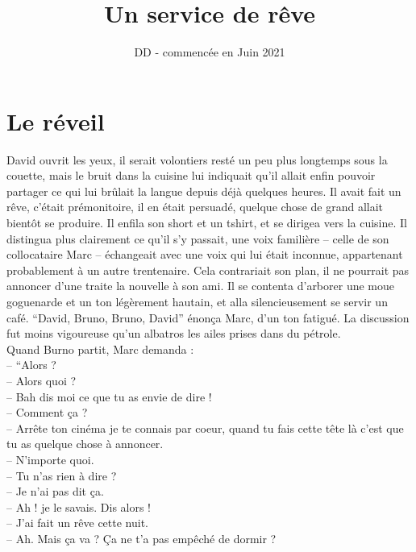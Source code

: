 \documentclass[french,amstex,12pt,a5paper]{book}
\begin{document}
\title{Un service de rêve}
\author{DD - commencée en Juin 2021}
\maketitle

\tableofcontents

\chapter{Le réveil}

David ouvrit les yeux, il serait volontiers resté un peu plus longtemps sous la couette, mais le bruit dans la cuisine lui indiquait qu'il allait enfin pouvoir partager ce qui lui brûlait la langue depuis déjà quelques heures. Il avait fait un rêve, c'était prémonitoire, il en était persuadé, quelque chose de grand allait bientôt se produire. Il enfila son short et un tshirt, et se dirigea vers la cuisine. Il distingua plus clairement ce qu'il s'y passait, une voix familière -- celle de son collocataire Marc -- échangeait avec une voix qui lui était inconnue, appartenant probablement à un autre trentenaire. Cela contrariait son plan, il ne pourrait pas annoncer d'une traite la nouvelle à son ami. Il se contenta d'arborer une moue goguenarde et un ton légèrement hautain, et alla silencieusement se servir un café. ``David, Bruno, Bruno, David'' énonça Marc, d'un ton fatigué. La discussion fut moins vigoureuse qu'un albatros les ailes prises dans du pétrole.\\

Quand Burno partit, Marc demanda :\\
-- ``Alors ?\\
-- Alors quoi ?\\
-- Bah dis moi ce que tu as envie de dire !\\
-- Comment ça ?\\
-- Arrête ton cinéma je te connais par coeur, quand tu fais cette tête là c'est que tu as quelque chose à annoncer.\\
-- N'importe quoi.\\
-- Tu n'as rien à dire ?\\
-- Je n'ai pas dit ça.\\
-- Ah ! je le savais. Dis alors !\\
-- J'ai fait un rêve cette nuit.\\
-- Ah. Mais ça va ? Ça ne t'a pas empêché de dormir ?\\
\end{document}
